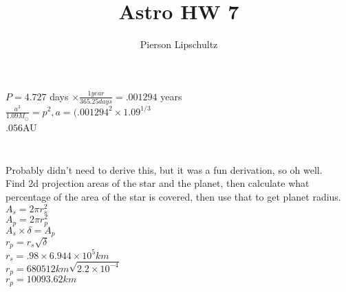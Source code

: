 \documentclass{article}
\title{Astro HW 7}
\author{Pierson Lipschultz}
\begin{document}
\maketitle
\setcounter{section}{7}

\subsection{}


\subsubsection{}

\begin{center} 
    \(P = 4.727\) days \(\times \frac{1 year}{365.25days} = .001294\) years \\
    \(\frac{a^3}{1.09 M_\odot} = p^2, a = (.001294^2 \times 1.09 ^{1/3}\) \\
    \(.056\)AU 
\end{center}

\subsubsection{}

\begin{center}
    \\
    Probably didn't need to derive this, but it was a fun derivation, so oh well. \\
    Find 2d projection areas of the star and the planet, then calculate what percentage of the area of the star is covered, then use that to get planet radius.\\
    \(A_s = 2\pi r_s^2\)\\
    \(A_p = 2\pi r_p^2\)\\
    \(A_s \times \delta = A_p\)\\
    \(r_p = r_s \sqrt{\delta}\) \\
    \(r_s = .98 \times 6.944 \times 10^5km\)\\
    \(r_p = 680512km\sqrt{2.2\times10^{-4}}\)\\
    \(r_p = 10093.62km\)
\end{center}
\end{document}
